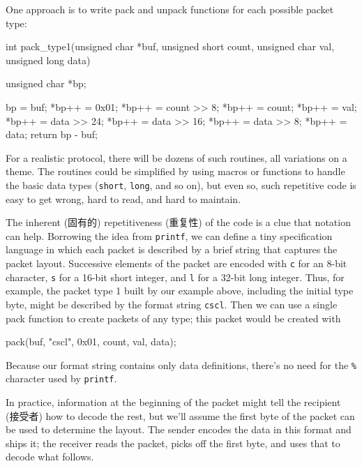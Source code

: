 One approach is to write pack and unpack functions for each possible packet
type:
\begin{wellcode}
    int pack_type1(unsigned char *buf, unsigned short count,
            unsigned char val, unsigned long data)
    {
        unsigned char *bp;

        bp = buf;
        *bp++ = 0x01;
        *bp++ = count >> 8;
        *bp++ = count;
        *bp++ = val;
        *bp++ = data >> 24;
        *bp++ = data >> 16;
        *bp++ = data >> 8;
        *bp++ = data;
        return bp - buf;
    }
\end{wellcode}
For a realistic protocol, there will be dozens of such routines, all
variations on a theme. The routines could be simplified by using macros or
functions to handle the basic data types (\verb'short', \verb'long', and so
on), but even so, such repetitive code is easy to get wrong, hard to read,
and hard to maintain.

The inherent (固有的) repetitiveness (重复性) of the code is a clue that
notation can help.  Borrowing the idea from \verb'printf', we can define a
tiny specification language in which each packet is described by a brief
string that captures the packet layout.  Successive elements of the packet
are encoded with \verb'c' for an 8-bit character, \verb's' for a 16-bit
short integer, and \verb'l' for a 32-bit long integer. Thus, for example,
the packet type 1 built by our example above, including the initial type
byte, might be described by the format string \verb'cscl'. Then we can use
a single pack function to create packets of any type; this packet would be
created with
\begin{wellcode}
    pack(buf, "cscl", 0x01, count, val, data);
\end{wellcode}
Because our format string contains only data definitions, there's no need
for the \verb'%' character used by \verb'printf'.

In practice, information at the beginning of the packet might tell the
recipient (接受者) how to decode the rest, but we'll assume the first byte
of the packet can be used to determine the layout. The sender encodes the
data in this format and ships it; the receiver reads the packet, picks off
the first byte, and uses that to decode what follows.

